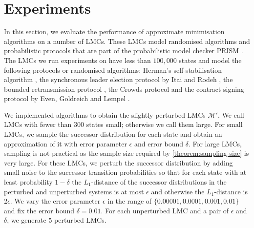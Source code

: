 \documentclass[a4paper,UKenglish,cleveref,autoref,thm-restate]{lipics-v2021}
\newcommand{\Hyp}{\mathcal{M}'}%
\begin{document}




\section{Experiments}
\label{section:experiments}
In this section, we evaluate the performance of approximate minimisation algorithms on a number of LMCs. These LMCs model randomised algorithms and probabilistic protocols that are part of the probabilistic model checker PRISM \cite{KNP11}. The LMCs we run experiments on have less than $100,000$ states and model the following protocols or randomised algorithms: Herman's self-stabilisation algorithm \cite{Her90}, the synchronous leader election protocol by Itai and Rodeh \cite{ItaiR90}, the bounded retransmission protocol \cite{DarhenioJJL01}, the Crowds protocol \cite{ReiterR98} and the contract signing protocol by Even, Goldreich and Lempel \cite{EvenGL85}.

We implemented algorithms to obtain the slightly perturbed LMCs $\Hyp$. We call LMCs with fewer than $300$ states small; otherwise we call them large. For small LMCs, we sample the successor distribution for each state and obtain an approximation of it with error parameter $\epsilon$ and error bound $\delta$. For large LMCs, sampling is not practical as the sample size required by \cref{theorem:sampling-size} is very large. For these LMCs, we perturb the successor distribution by adding small noise to the successor transition probabilities so that for each state with at least probability $1-\delta$ the $L_1$-distance of the successor distributions in the perturbed and unperturbed systems is at most $\epsilon$ and otherwise the $L_1$-distance is $2\epsilon$. We vary the error parameter $\epsilon$ in the range of $\{0.00001, 0.0001, 0.001, 0.01\}$ and fix the error bound $\delta = 0.01$. For each unperturbed LMC and a pair of $\epsilon$ and $\delta$, we generate $5$ perturbed LMCs.
\end{document}
